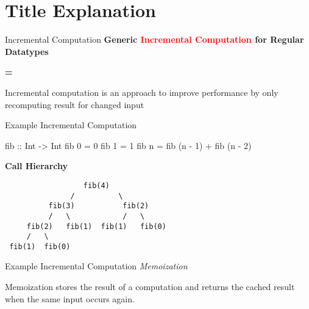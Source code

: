 \section{Title Explanation}


\begin{slide}{Incremental Computation}
\centering
\large \textbf{Generic \textcolor{red}{Incremental Computation} for Regular Datatypes}

\vspace*{.5cm}
\textbf{=}
\vspace*{.5cm}

Incremental computation is an approach to improve performance by only recomputing result for changed input

\end{slide}


\begin{slide}{Example Incremental Computation}
\begin{haskell}
fib :: Int -> Int
fib 0 = 0
fib 1 = 1
fib n = fib (n - 1) + fib (n - 2)
\end{haskell}
\begin{center}  
\textbf{Call Hierarchy}

\vspace*{.2cm}
\begin{verbatim}
                  fib(4)  
               /          \
          fib(3)           fib(2)
          /   \            /   \
     fib(2)   fib(1)  fib(1)   fib(0)
     /   \
 fib(1)  fib(0)
\end{verbatim}
\end{center}
\end{slide}

\begin{slide}{Example Incremental Computation}
\centering
{\huge \textit{Memoization}}

\vspace*{0.4cm}

Memoization stores the result of a computation and returns the cached result when the same input occurs again.

\end{slide}

